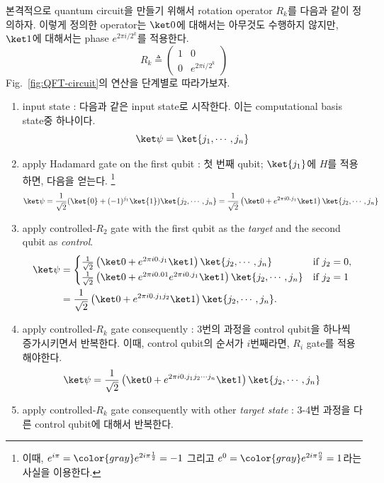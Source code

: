 \vspace{1em}
본격적으로 quantum circuit을 만들기 위해서 rotation operator $R_k$를 다음과 같이 정의하자. 이렇게 정의한 operator는 $\ket 0$에 대해서는 아무것도 수행하지 않지만, $\ket 1$에 대해서는 phase $e^{2\pi i / 2^k}$를 적용한다.
\begin{equation*}
  R_k \triangleq \left(\begin{array}{cc}
  1 & 0 \\
  0 & e^{2 \pi i / 2^k}
  \end{array}\right)
\end{equation*}
Fig.~\ref{fig:QFT-circuit}의 연산을 단계별로 따라가보자.
\begin{enumerate}
  \item input state : 다음과 같은 input state로 시작한다. 이는 computational basis state중 하나이다.
  \begin{equation*}
    \ket \psi = \ket{j_1,\cdots, j_n}
  \end{equation*}
  \item apply Hadamard gate on the first qubit : 첫 번째 qubit; $\ket{j_1}$에 $H$를 적용하면, 다음을 얻는다.
  \footnote{이때, $e^{i\pi} = {\color{gray}e^{2i\pi \frac{1}{2}}} = -1$ 그리고 $e^{0} = {\color{gray}e^{2i\pi \frac{0}{2}}} = 1$라는 사실을 이용한다.}
  \begin{equation*}
    \ket \psi = \frac{1}{\sqrt 2} (\ket{0} + (-1)^{j_1}\ket{1})\ket{j_2, \cdots, j_n} = \frac{1}{\sqrt 2} \left( \ket 0 + e^{2\pi i 0.j_1} \ket 1 \right) \ket{j_2, \cdots, j_n}
  \end{equation*}
  \item apply controlled-$R_2$ gate with the first qubit as the \textit{target} and the second qubit as \textit{control}.
  \begin{align*}
    \ket \psi &= \begin{cases} 
        \frac{1}{\sqrt 2} \left( \ket 0 + e^{2\pi i 0.j_1} \ket 1 \right) \ket{j_2, \cdots, j_n} & \text{if } j_2 = 0, \\ 
        \frac{1}{\sqrt 2} \left( \ket 0 + e^{2\pi i 0.01} e^{2\pi i 0.j_1} \ket 1 \right) \ket{j_2, \cdots, j_n} & \text{if } j_2 = 1 
    \end{cases}\\ 
              &= \frac{1}{\sqrt 2} \left( \ket 0 + e^{2\pi i 0.j_1j_2} \ket 1 \right) \ket{j_2, \cdots, j_n}.
\end{align*}
\newpage
  \item apply controlled-$R_k$ gate consequently : 3번의 과정을 control qubit을 하나씩 증가시키면서 반복한다. 이때, control qubit의 순서가 $i$번째라면, $R_i$ gate를 적용해야한다.
  \begin{equation*}
    \ket \psi = \frac{1}{\sqrt 2} \left( \ket 0 + e^{2\pi i 0.j_1j_2 \cdots j_n} \ket 1 \right) \ket{j_2, \cdots, j_n} 
  \end{equation*}
  \item apply controlled-$R_k$ gate consequently with other \textit{target state}  : 3-4번 과정을 다른 control qubit에 대해서 반복한다. 
  

\end{enumerate}
